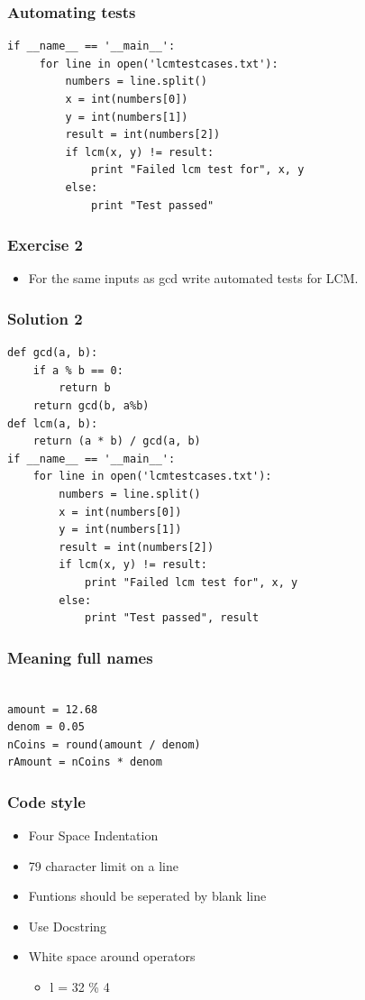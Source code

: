 \documentclass[presentation]{beamer}
\begin{document}
\begin{frame}[fragile]
\frametitle{Automating tests}
\label{sec-9}

\lstset{language=Python}
\begin{lstlisting}
if __name__ == '__main__':
     for line in open('lcmtestcases.txt'):
         numbers = line.split()
         x = int(numbers[0])
         y = int(numbers[1])
         result = int(numbers[2])
         if lcm(x, y) != result:
             print "Failed lcm test for", x, y
         else:
             print "Test passed"
\end{lstlisting}
\end{frame}
\begin{frame}
\frametitle{Exercise 2}
\label{sec-10}


\begin{itemize}
\item For the same inputs as gcd write automated tests for LCM.
\end{itemize}
\end{frame}
\begin{frame}[fragile]
\frametitle{Solution 2}
\label{sec-11}

\lstset{language=Python}
\begin{lstlisting}
def gcd(a, b):
    if a % b == 0: 
        return b
    return gcd(b, a%b)
def lcm(a, b):
    return (a * b) / gcd(a, b)
if __name__ == '__main__':
    for line in open('lcmtestcases.txt'):
        numbers = line.split()
        x = int(numbers[0])
        y = int(numbers[1])
        result = int(numbers[2])
        if lcm(x, y) != result:
            print "Failed lcm test for", x, y
        else:
            print "Test passed", result
\end{lstlisting}
\end{frame}
\begin{frame}[fragile]
\frametitle{Meaning full names}
\label{sec-12}

\lstset{language=Python}
\begin{lstlisting}

amount = 12.68
denom = 0.05
nCoins = round(amount / denom)
rAmount = nCoins * denom
\end{lstlisting}
\end{frame}
\begin{frame}
\frametitle{Code style}
\label{sec-13}


\begin{itemize}
\item Four Space Indentation
\item 79 character limit on a line
\item Funtions should be seperated by 
   blank line
\item Use Docstring
\item White space around operators
\begin{itemize}
\item l = 32 \% 4
\end{itemize}
\end{itemize}
\end{frame}
\end{document}
